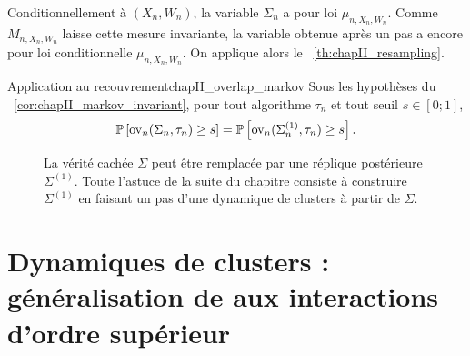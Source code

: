 \begin{Preuve}
Conditionnellement à $(X_n,W_n)$, la variable $\Sigma_n$ a pour loi $\mu_{n,X_n,W_n}$. Comme $M_{n,X_n,W_n}$ laisse cette mesure invariante, la variable obtenue après un pas a encore pour loi conditionnelle $\mu_{n,X_n,W_n}$. On applique alors le \Th~\ref{th:chapII_resampling}.
\end{Preuve}

\begin{Corollaire}{Application au recouvrement}{chapII_overlap_markov}
Sous les hypothèses du \Cor~\ref{cor:chapII_markov_invariant}, pour tout algorithme $\tau_n$ et tout seuil $s\in[0 ; 1]$,
\begin{equation}
    \mathbb P\left[\operatorname{ov}_n(\Sigma_n,\tau_n)\ge s\right]
    =
    \mathbb P\left[\operatorname{ov}_n(\Sigma_n^{(1)},\tau_n)\ge s\right].
    \label{eq:chapII_overlap_markov_proba}
\end{equation}
\end{Corollaire}

\begin{figure}[H]
\centering
{}
\caption{La vérité cachée $\Sigma$ peut être remplacée par une réplique postérieure $\Sigma^{(1)}$. Toute l'astuce de la suite du chapitre consiste à construire $\Sigma^{(1)}$ en faisant un pas d'une dynamique de clusters à partir de $\Sigma$.}
\label{fig:chapII_resampling}
\end{figure}

\section{Dynamiques de clusters : généralisation de  aux interactions d'ordre supérieur}
\label{sec:chapII_partie_dynamique}

